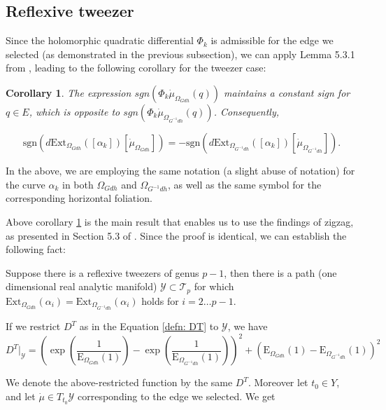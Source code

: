 \documentclass[12pt,epsfig,tikz,multi]{amsart}
\newtheorem{corollary}[theorem]{Corollary}
\numberwithin{equation}{section}
\begin{document}
\subsection{Reflexive tweezer}
Since the holomorphic quadratic differential $\Phi_k$  is admissible for the edge we selected (as demonstrated in the previous subsection), we can apply Lemma 5.3.1 from \cite{Weber1998TeichmullerTA}, leading to the following corollary for the tweezer case:
\begin{corollary}\label{sgnQuadraticDifferential}
The expression $sgn(\Phi_k \dot{\mu}_{\Omega_{Gdh}}(q))$ maintains a constant sign for $q \in E$, which is opposite to $sgn(\Phi_k \dot{\mu}_{\Omega_{G^{-1}dh}}(q))$. Consequently,

$$\text{sgn}\left( d\text{Ext}_{\Omega_{Gdh}}([\alpha_k])[\dot{\mu}_{\Omega_{Gdh}}] \right) = -\text{sgn}\left( d\text{Ext}_{\Omega_{G^{-1}dh}}([\alpha_k])[\dot{\mu}_{\Omega_{G^{-1}dh}}] \right).$$

\end{corollary}
In the above, we are employing the same notation (a slight abuse of notation) for the curve $\alpha_k$ in both $\Omega_{Gdh}$ and $\Omega_{G^{-1}dh}$, as well as the same symbol for the corresponding horizontal foliation.    

Above corollary \ref{sgnQuadraticDifferential} is the main result that enables us to use the findings of zigzag, as presented in Section 5.3 of \cite{weber1998minimal}. Since the proof is identical, we can establish the following fact: 

Suppose there is a reflexive tweezers of genus $p-1$, then there is a path (one dimensional real analytic manifold) $\mathcal{Y} \subset \mathcal{T}_p$ for which $\text{Ext}_{\Omega_{Gdh}}(\alpha_i) = \text{Ext}_{\Omega_{G^{-1}dh}}(\alpha_i)$ holds for $i = 2 \ldots p-1$.

If we restrict $D^T$ as in the Equation \eqref{defn: DT} to $\mathcal{Y}$, we have 
\[
    D^T|_{\mathcal{Y}} = \left(\exp\left(\frac{1}{\text{E}_{\Omega_{Gdh}}(1)}\right) - \exp\left(\frac{1}{\text{E}_{\Omega_{G^{-1}dh}}(1)}\right)\right)^2 + \left(\text{E}_{\Omega_{Gdh}}(1) - \text{E}_{\Omega_{G^{-1}dh}}(1)\right)^2
\]


We denote the above-restricted function by the same $D^T$. 
 Moreover let $t_0\in Y$,   and let $\dot{\mu}\in T_{t_0}\mathcal{Y}$ corresponding to the edge we selected. We get
\end{document}
